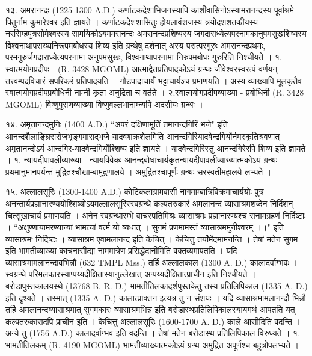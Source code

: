 १३. अमरानन्दः (1225-1300 A.D.)
कर्णाटकदेशाभिजनस्यापि काशीवासिनोऽस्यामरानन्दस्य पूर्वाश्रमे पितुर्नाम कुमारेश्वर इति ज्ञायते । कर्णाटकदेशशासितुः होयलावंशजस्य त्रयोदशशतकीयस्य नरसिम्हपुत्रसोमेश्वरस्य सामयिकोऽयममरानन्दः अमरानन्दप्रशिष्यस्य जगदाराध्येत्यपरनामकानुपमसुखशिष्यस्य विश्वनाथापराख्यनिरूपमबोधस्य शिष्य इति ग्रन्थेषु दर्शनात् अस्य परात्परगुरुः अमरानन्दप्रथमः, परमगुरुर्जगदाराध्येत्यपरनामा अनुपमसुखः, विश्वनाथापरनामा निरुपमबोधः गुरुरिति निश्चीयते ।
१. स्वात्मयोगप्रदीपः - (R. 3428 MGOML)
आत्माद्वैतप्रतिपादकोऽयं ग्रन्थः जीवेश्वरस्वरूपं वर्णयन् तत्त्वम्पदविचारं सपरिकरं प्रतिपादयति । गौडपादाचार्यं भट्टाचार्यञ्च प्रमाणयति । अस्य व्याख्यापि मूलकृतैव स्वात्मयोगप्रदीपप्रबोधिनी नाम्नी कृता अनुद्रिता च वर्तते ।
२.स्वात्मयोगप्रदीपव्याख्या - प्रबोधिनी (R. 3428 MGOML) विष्णुपुराणव्याख्या विष्णुवल्लभानाम्न्यपि अदसीयः ग्रन्थः ।

१४. अमृतानन्दमुनिः (1400 A.D.)
``अपरं दक्षिणामूर्तिं तमानन्दगिरिं भजे" इति आनन्दशैलाङ्घ्रिसरोजभृङ्गमाराद्भजे यादवशक्रशेलमिति आनन्दगिरियादवेन्द्रगिर्योर्नमस्कृतिश्रवणात् अमृतानन्दोऽयं आन्दगिर-यादवेन्द्रगिर्योश्शिष्य इति ज्ञायते । यादवेन्द्रगिरिस्तु आनन्दगिरेरपि शिष्य इति ज्ञायते ।
१. न्यायदीपावलीव्याख्या - न्यायविवेकः
आनन्दबोधाचार्यकृतन्यायदीपावलीव्याख्यात्मकोऽयं ग्रन्थः प्रथमानुमानपर्यन्तं मुद्रितश्चौखाम्बामुद्रणालये । अमुद्रितश्चापूर्णः ग्रन्थः सरस्वतीमहालये लभ्यते ।

१५. अल्लालसूरिः (1300-1400 A.D.)
कोटिकलाग्रामवासी नागमाम्बात्रिविक्रमाचार्ययोः पुत्र अनन्तार्यप्रज्ञानारण्ययोश्शिष्योऽयमल्लालसूरिस्स्वग्रन्थे कल्पतरुकारं अमलानन्दं व्यासाश्रमशब्देन निर्दिशन् चित्सुखाचार्यं प्रमाणयति । अनेन स्वग्रन्थारम्भे वाचस्पतिमिश्रः व्यासाश्रमः प्रज्ञानारण्यश्च सनामग्रहणं निर्दिष्टाः ।
``अक्षुण्णायामरण्यान्यां भामत्यां वर्त्म यो व्यधात् ।
सुगमं प्रणमामस्तं व्यासाश्रममुनीश्वरम् ।।"
इति व्यासाश्रमः निर्दिष्टः । व्यासाश्रम एवामलानन्द इति केचित् । केचित्तु तर्योर्मेदमामनन्ति । तेषां मतेन सुगम इति भामतीव्याख्या काचनासीद्या नाममात्रेण प्रसिद्धेदानीमिति वक्तव्यमापतति ।
यदि व्यासाश्रमामलानन्दावभिन्नौ (632 TMPL Mss.) तर्हि अल्लालकाल (1300 A. D.) कालादर्वाग्भवः । स्वग्रन्थे परिमलकारस्याप्पय्यदीक्षितास्यानुल्लेखात् अप्पय्यदीक्षितात्प्राचीन इति निश्चीयते । बरोडापुस्तकालयस्थे (13768 B. R. D.) भामतीतिलकादर्शपुस्तकेतु तस्य प्रतिलिपिकाल (1335 A. D.) इति दृश्यते । तस्मात् (1335 A. D.) कालात्प्राक्तन इत्यत्र तु न संशयः । यदि व्यासाश्रमामलानन्दौ भिन्नौ तर्हि अमलानन्दव्यासाश्रमात् सुगमकारः व्यासाश्रमभिन्न इति बरोडास्थप्रतिलिपिकालस्यायमर्थ आपतति यत् कल्पतरुकारादपि प्राचीन इति । केचित्तु अल्लालसूरिः (1600-1700 A. D.) काले आसीदिति वदन्ति । अन्ये तु (1756 A.D.) कालादर्वाग्भव इति वदन्ति । तेषां मतेन बरोडास्थ प्रतिलिपिकाल विरुध्यते ।
१. भामतीतिलकम् (R. 4190 MGOML)
भामतीव्याख्यात्मकोऽयं ग्रन्थ अमुद्रित अपूर्णश्च बहुत्रोपलभ्यते ।

